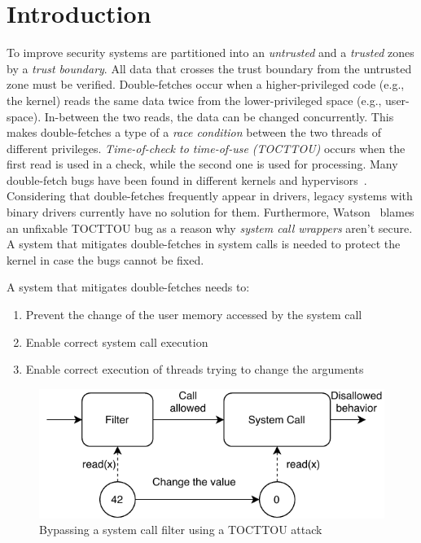 \section{Introduction}


To improve security systems are partitioned into an \emph{untrusted} and a
\emph{trusted} zones by a \emph{trust boundary}. All data that crosses the trust
boundary from the untrusted zone must be verified.
Double-fetches\cite{serna08doublefetch, twizsgrakky07ring0, wilhelm2016xenpwn,
wang2018survey} occur when a higher-privileged code (e.g., the kernel) reads the
same data twice from the lower-privileged space (e.g., user-space). In-between
the two reads, the data can be changed concurrently. This makes double-fetches a
type of a \emph{race condition} between the two threads of different privileges.
\emph{Time-of-check to time-of-use (TOCTTOU)} occurs when the first read is used
in a check, while the second one is used for processing. Many double-fetch bugs
have been found in different kernels and hypervisors~\cite{cve201812633,
cve202012652, cve20131332, cve201920610, cve20158550, cve201610439,
cve201610435, cve201610433, cve20195519, cve20168438}. Considering that
double-fetches frequently appear in drivers, legacy systems with binary drivers
currently have no solution for them. Furthermore, Watson~\cite{watson2007} blames
an unfixable TOCTTOU bug as a reason why \emph{system call wrappers} aren't
secure. A system that mitigates double-fetches in system calls is needed to
protect the kernel in case the bugs cannot be fixed.


A system that mitigates double-fetches needs to:
\begin{enumerate}
  \item Prevent the change of the user memory accessed by the system call
  \item Enable correct system call execution
  \item Enable correct execution of threads trying to change the arguments
\end{enumerate}


\begin{figure}[]
  \centering
  \includegraphics[width=.85\linewidth]{img/tocttou.pdf}
  \caption{Bypassing a system call filter using a TOCTTOU attack}
  \label{fig:tocttou}
\end{figure}

